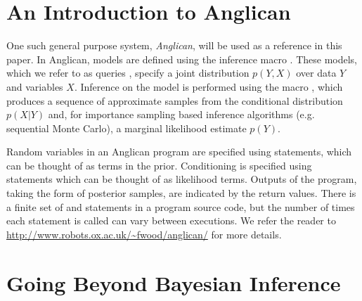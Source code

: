 



\section{An Introduction to Anglican}
\label{sec:probprog:anglican}

One such general purpose system, \emph{Anglican}, will be used as a reference in this paper.  In Anglican, models are defined using the inference macro . These models, which we refer to as queries \citep{goodman_uai_2008}, specify a joint distribution $p(Y,X)$ over data $Y$ and variables $X$. Inference on the model is performed using the macro \doquery, which produces a sequence of approximate samples from the conditional distribution $p(X|Y)$ and, for importance sampling based inference algorithms (e.g. sequential Monte Carlo), a marginal likelihood estimate $p(Y)$.  

Random variables in an Anglican program are specified using \sample statements, which can be thought of as terms in the prior. Conditioning is specified using \observe statements which can be thought of as likelihood terms.  Outputs of the program, taking the form of posterior samples, are indicated by the return values.  There is a finite set of \sample and \observe statements in a program source code, but the number of times each statement is called can vary between executions.  We refer the reader to  \href{http://www.robots.ox.ac.uk/~fwood/anglican/}{\small\url{http://www.robots.ox.ac.uk/~fwood/anglican/}} for more details.

\section{Going Beyond Bayesian Inference}
\label{sec:probprog:limit}

